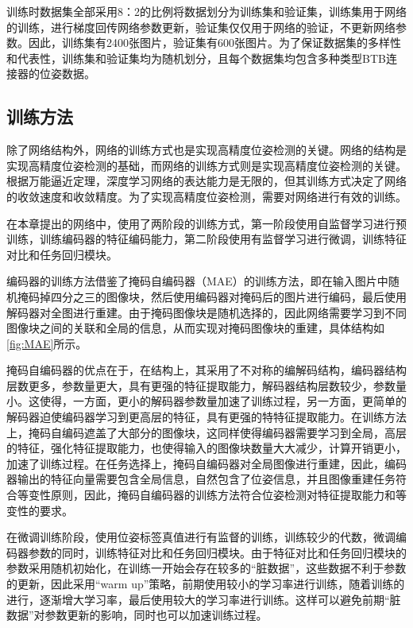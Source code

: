 \documentclass{Diploma}
\begin{document}
训练时数据集全部采用8：2的比例将数据划分为训练集和验证集，训练集用于网络的训练，进行梯度回传网络参数更新，验证集仅仅用于网络的验证，不更新网络参数。因此，训练集有2400张图片，验证集有600张图片。为了保证数据集的多样性和代表性，训练集和验证集均为随机划分，且每个数据集均包含多种类型BTB连接器的位姿数据。
\subsection{训练方法}
除了网络结构外，网络的训练方式也是实现高精度位姿检测的关键。网络的结构是实现高精度位姿检测的基础，而网络的训练方式则是实现高精度位姿检测的关键。根据万能逼近定理，深度学习网络的表达能力是无限的，但其训练方式决定了网络的收敛速度和收敛精度。为了实现高精度位姿检测，需要对网络进行有效的训练。

在本章提出的网络中，使用了两阶段的训练方式，第一阶段使用自监督学习进行预训练，训练编码器的特征编码能力，第二阶段使用有监督学习进行微调，训练特征对比和任务回归模块。

%

编码器的训练方法借鉴了掩码自编码器（MAE）\cite{he2022masked}的训练方法，即在输入图片中随机掩码掉四分之三的图像块，然后使用编码器对掩码后的图片进行编码，最后使用解码器对全图进行重建。由于掩码图像块是随机选择的，因此网络需要学习到不同图像块之间的关联和全局的信息，从而实现对掩码图像块的重建，具体结构如\ref{fig:MAE}所示。

掩码自编码器的优点在于，在结构上，其采用了不对称的编解码结构，编码器结构层数更多，参数量更大，具有更强的特征提取能力，解码器结构层数较少，参数量小。这使得，一方面，更小的解码器参数量加速了训练过程，另一方面，更简单的解码器迫使编码器学习到更高层的特征，具有更强的特特征提取能力。在训练方法上，掩码自编码遮盖了大部分的图像块，这同样使得编码器需要学习到全局，高层的特征，强化特征提取能力，也使得输入的图像块数量大大减少，计算开销更小，加速了训练过程。在任务选择上，掩码自编码器对全局图像进行重建，因此，编码器输出的特征向量需要包含全局信息，自然包含了位姿信息，并且图像重建任务符合等变性原则，因此，掩码自编码器的训练方法符合位姿检测对特征提取能力和等变性的要求。

在微调训练阶段，使用位姿标签真值进行有监督的训练，训练较少的代数，微调编码器参数的同时，训练特征对比和任务回归模块。由于特征对比和任务回归模块的参数采用随机初始化，在训练一开始会存在较多的“脏数据”，这些数据不利于参数的更新，因此采用“warm up”策略，前期使用较小的学习率进行训练，随着训练的进行，逐渐增大学习率，最后使用较大的学习率进行训练。这样可以避免前期“脏数据”对参数更新的影响，同时也可以加速训练过程。
\end{document}
